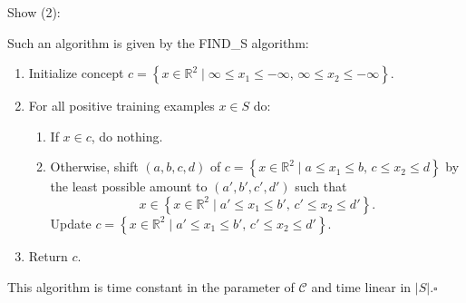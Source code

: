 Show (2):

Such an algorithm is given by the FIND\_S algorithm:
\begin{enumerate}
\item Initialize concept $c=\left\{ x\in\mathbb{R}^{2}\mid\infty\leq x_{1}\leq-\infty,\,\infty\leq x_{2}\leq-\infty\right\} $.
\item For all positive training examples $x\in S$ do:

\begin{enumerate}
\item If $x\in c$, do nothing.
\item Otherwise, shift $(a,b,c,d)$ of $c=\left\{ x\in\mathbb{R}^{2}\mid a\leq x_{1}\leq b,\, c\leq x_{2}\leq d\right\} $
by the least possible amount to $(a',b',c',d')$ such that 
\[
x\in\left\{ x\in\mathbb{R}^{2}\mid a'\leq x_{1}\leq b',\, c'\leq x_{2}\leq d'\right\} .
\]
Update $c=\left\{ x\in\mathbb{R}^{2}\mid a'\leq x_{1}\leq b',\, c'\leq x_{2}\leq d'\right\} $.
\end{enumerate}
\item Return $c$.
\end{enumerate}
This algorithm is time constant in the parameter of $\mathcal{C}$
and time linear in $\vert S\vert$.\newline \phantom{x}\hfill $\square$